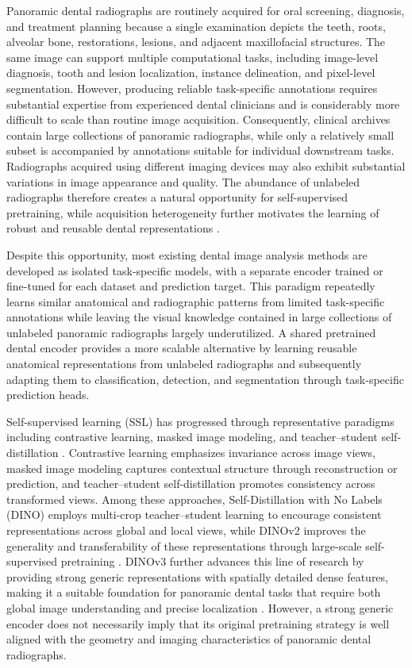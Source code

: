 \documentclass[conference]{IEEEtran}
\begin{document}
Panoramic dental radiographs are routinely acquired for oral screening, diagnosis, and treatment planning because a single examination depicts the teeth, roots, alveolar bone, restorations, lesions, and adjacent maxillofacial structures. The same image can support multiple computational tasks, including image-level diagnosis, tooth and lesion localization, instance delineation, and pixel-level segmentation. However, producing reliable task-specific annotations requires substantial expertise from experienced dental clinicians and is considerably more difficult to scale than routine image acquisition. Consequently, clinical archives contain large collections of panoramic radiographs, while only a relatively small subset is accompanied by annotations suitable for individual downstream tasks. Radiographs acquired using different imaging devices may also exhibit substantial variations in image appearance and quality. The abundance of unlabeled radiographs therefore creates a natural opportunity for self-supervised pretraining, while acquisition heterogeneity further motivates the learning of robust and reusable dental representations \cite{schwendicke2020ai,schneider2023fed_toothseg,rischke2022fldentistry}.

Despite this opportunity, most existing dental image analysis methods are developed as isolated task-specific models, with a separate encoder trained or fine-tuned for each dataset and prediction target. This paradigm repeatedly learns similar anatomical and radiographic patterns from limited task-specific annotations while leaving the visual knowledge contained in large collections of unlabeled panoramic radiographs largely underutilized. A shared pretrained dental encoder provides a more scalable alternative by learning reusable anatomical representations from unlabeled radiographs and subsequently adapting them to classification, detection, and segmentation through task-specific prediction heads.

Self-supervised learning (SSL) has progressed through representative paradigms including contrastive learning, masked image modeling, and teacher--student self-distillation \cite{chen2021empirical,bao2021beit,he2021mae,caron2021emerging}. Contrastive learning emphasizes invariance across image views, masked image modeling captures contextual structure through reconstruction or prediction, and teacher--student self-distillation promotes consistency across transformed views. Among these approaches, Self-Distillation with No Labels (DINO) employs multi-crop teacher--student learning to encourage consistent representations across global and local views, while DINOv2 improves the generality and transferability of these representations through large-scale self-supervised pretraining \cite{caron2021emerging,oquab2023dinov2}. DINOv3 further advances this line of research by providing strong generic representations with spatially detailed dense features, making it a suitable foundation for panoramic dental tasks that require both global image understanding and precise localization \cite{simeoni2025dinov3}. However, a strong generic encoder does not necessarily imply that its original pretraining strategy is well aligned with the geometry and imaging characteristics of panoramic dental radiographs.
\end{document}
